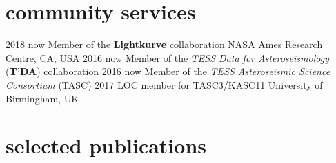 \documentclass[]{k-cv} %
\begin{document}
\clearpage
{}

\section{\color{c1}community services}
\begin{entrylist}
	\centrythree
	{2018 \to now}
	{Member of the \textbf{\textcolor{c1}{Lightkurve}} collaboration}
	{NASA Ames Research Centre, CA, USA}
	\centrythree
	{2016 \to now}
	{Member of the \emph{TESS Data for Asteroseismology} (\textbf{\textcolor{c1}{T'DA}}) collaboration }
	{}
	\centrythree
	{2016 \to now}
	{Member of the \emph{TESS Asteroseismic Science Consortium} (TASC)}
	{}
	\centrythree
	{2017}
	{LOC member for TASC3/KASC11}
	{University of Birmingham, UK}
\end{entrylist}






\section{\color{c3}selected publications}
\vspace{-0.5cm}
\end{document}
